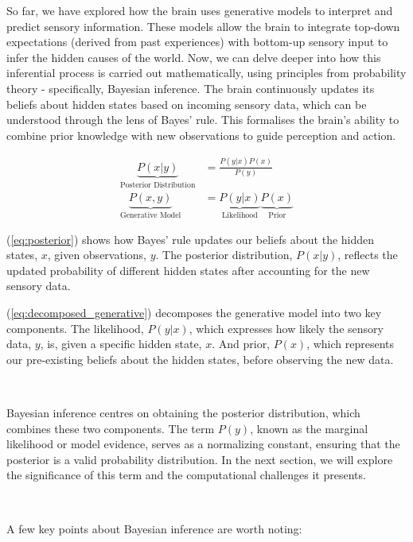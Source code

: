 \documentclass{article}
\newcommand{\refp}[1]{(\ref{#1})}
\begin{document}
So far, we have explored how the brain uses generative models to interpret and predict sensory information. These models allow the brain to integrate top-down expectations (derived from past experiences) with bottom-up sensory input to infer the hidden causes of the world. Now, we can delve deeper into how this inferential process is carried out mathematically, using principles from probability theory - specifically, Bayesian inference. The brain continuously updates its beliefs about hidden states based on incoming sensory data, which can be understood through the lens of Bayes' rule. This formalises the brain's ability to combine prior knowledge with new observations to guide perception and action.

\begin{align}
	\underbrace{P(x | y )}_{\text{Posterior Distribution}} &= \frac{P(y | x)P(x)}{P(y)} \label{eq:posterior} \\
	\underbrace{P(x, y)}_{\text{Generative Model}} &= \underbrace{P(y | x)}_{\text{Likelihood}}\underbrace{P(x)}_{\text{Prior}} \label{eq:decomposed_generative}
\end{align}

\refp{eq:posterior} shows how Bayes' rule updates our beliefs about the hidden states, $x$, given observations, $y$. The posterior distribution, $P(x | y)$, reflects the updated probability of different hidden states after accounting for the new sensory data.

\refp{eq:decomposed_generative} decomposes the generative model into two key components. The likelihood, $P(y | x)$, which expresses how likely the sensory data, $y$, is, given a specific hidden state, $x$. And prior, $P(x)$, which represents our pre-existing beliefs about the hidden states, before observing the new data.

\

Bayesian inference centres on obtaining the posterior distribution, which combines these two components. The term $P(y)$, known as the marginal likelihood or model evidence, serves as a normalizing constant, ensuring that the posterior is a valid probability distribution. In the next section, we will explore the significance of this term and the computational challenges it presents.

\

A few key points about Bayesian inference are worth noting:
\end{document}
